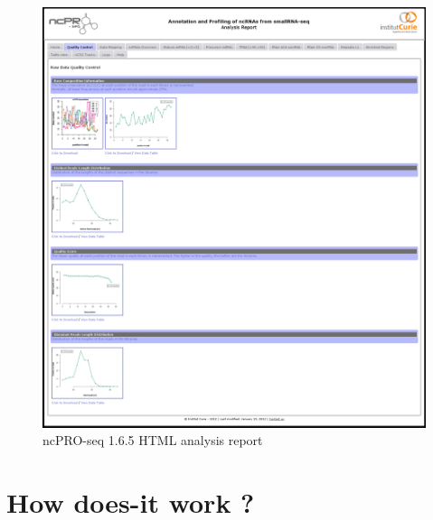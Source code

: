 \documentclass[12pt]{article}
\def \ncpip{ncPRO-seq 1.6.5}
\begin{document}
\begin{figure}[!h]
\includegraphics[width=\textwidth]{web_9.png}
\caption{\ncpip{} HTML analysis report}
\label{fig:report}
\end{figure}
\newpage

\section{How does-it work ?}
\end{document}
